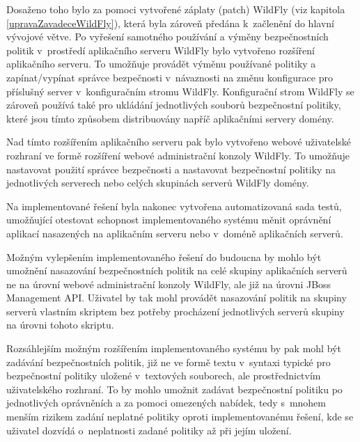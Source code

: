 Dosaženo toho bylo za pomoci vytvořené záplaty (patch) WildFly (viz kapitola \ref{upravaZavadeceWildFly}), která byla zároveň předána
k~začlenění do hlavní vývojové větve. \cite{jmPullRequest}
Po vyřešení samotného používání a výměny bezpečnostních politik v~prostředí aplikačního serveru WildFly bylo vytvořeno rozšíření aplikačního serveru.
To umožňuje provádět výměnu používané politiky a zapínat/vypínat správce bezpečnosti v~návaznosti na změnu konfigurace pro příslušný server
v~konfiguračním stromu WildFly.
Konfigurační strom WildFly se zároveň používá také pro ukládání jednotlivých souborů bezpečnostní politiky, které jsou tímto způsobem distribuovány napříč aplikačními servery domény.

Nad tímto rozšířením aplikačního serveru pak bylo vytvořeno webové uživatelské rozhraní ve formě rozšíření webové administrační konzoly WildFly.
To umožňuje nastavovat použití správce bezpečnosti a nastavovat bezpečnostní politiky na jednotlivých serverech nebo celých skupinách serverů WildFly domény.

Na implementované řešení byla nakonec vytvořena automatizovaná sada testů, umožňující otestovat schopnost implementovaného systému měnit oprávnění
aplikací nasazených na aplikačním serveru nebo v~doméně aplikačních serverů.

Možným vylepšením implementovaného řešení do budoucna by mohlo být umožnění nasazování bezpečnostních politik na celé skupiny aplikačních serverů ne na úrovní webové administrační konzoly WildFly, ale již na úrovni JBoss Management API. Uživatel by tak mohl provádět nasazování politik na skupiny serverů vlastním skriptem bez potřeby procházení jednotlivých serverů skupiny na úrovni tohoto skriptu.

Rozsáhlejším možným rozšířením implementovaného systému by pak mohl být zadávání bezpečnostních politik, již ne ve formě textu v~syntaxi typické pro bezpečnostní politiky uložené v~textových souborech, ale prostřednictvím uživatelského rozhraní.
To by mohlo umožnit zadávat bezpečnostní politiku po jednotlivých oprávněních a za pomoci omezených nabídek, tedy s~mnohem menším rizikem zadání neplatné politiky oproti implementovanému řešení, kde se uživatel dozvídá o~neplatnosti zadané politiky až při jejím uložení.

